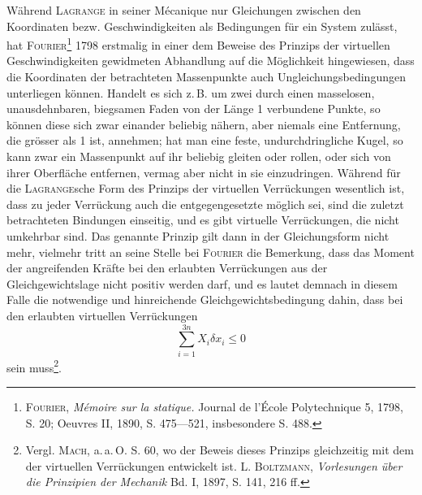 \clearpage\begingroup{}
\makeatletter\tagsleft@true\let\veqno\@@leqno\makeatother
\renewcommand{\thefootnote}{\arabic{footnote})}\setcounter{footnote}{45}
\begin{center}\end{center}
\noindent\hspace*{\parindent}Während \textsc{Lagrange} in seiner Mécanique nur Gleichungen zwischen den
Koordinaten bezw. Geschwindigkeiten als Bedingungen für ein System zulässt,
hat \textsc{Fourier}\footnote{\textsc{Fourier}, \textit{Mémoire sur la statique.} Journal de l’École Polytechnique 5, 1798, S. 20; Oeuvres
II, 1890, S. 475—521, insbesondere S. 488.} 1798 erstmalig in einer dem Beweise des Prinzips der virtuellen
Geschwindigkeiten gewidmeten Abhandlung auf die Möglichkeit hingewiesen,
dass die Koordinaten der betrachteten Massenpunkte auch Ungleichungsbedingungen
unterliegen können. Handelt es sich z.\,B. um zwei durch einen masselosen,
unausdehnbaren, biegsamen Faden von der Länge 1 verbundene Punkte,
so können diese sich zwar einander beliebig nähern, aber niemals eine Entfernung,
die grösser als 1 ist, annehmen; hat man eine feste, undurchdringliche Kugel,
so kann zwar ein Massenpunkt auf ihr beliebig gleiten oder rollen, oder sich
von ihrer Oberfläche entfernen, vermag aber nicht in sie einzudringen. Während
für die \textsc{Lagrange}sche Form des Prinzips der virtuellen Verrückungen wesentlich
ist, dass zu jeder Verrückung auch die entgegengesetzte möglich sei, sind
die zuletzt betrachteten Bindungen einseitig, und es gibt virtuelle Verrückungen,
die nicht umkehrbar sind. Das genannte Prinzip gilt dann in der Gleichungsform
nicht mehr, vielmehr tritt an seine Stelle bei \textsc{Fourier} die Bemerkung, dass
das Moment der angreifenden Kräfte bei den erlaubten Verrückungen aus
der Gleichgewichtslage nicht positiv werden darf, und es lautet demnach in
diesem Falle die notwendige und hinreichende Gleichgewichtsbedingung dahin,
dass bei den erlaubten virtuellen Verrückungen
\[
\sum_{i=1}^{3n}X_i\delta x_i\leq0\tag{9}
\]
\noindent sein muss\footnote{Vergl. \textsc{Mach}, a.\,a.\,O. S. 60, wo der Beweis dieses Prinzips gleichzeitig mit dem der virtuellen
Verrückungen entwickelt ist. L. \textsc{Boltzmann}, \textit{Vorlesungen über die Prinzipien der Mechanik} Bd. I, 1897,
S. 141, 216 ff.}.
\clearpage{}
\HistoricalFoot{}{4\textsuperscript{*}}
